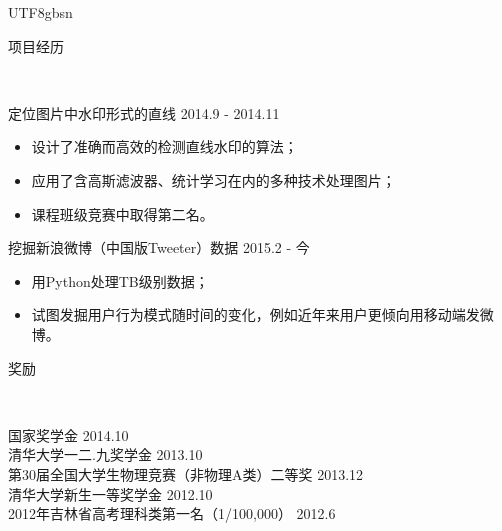 \documentclass[9pt]{article}
\newenvironment{changemargin}[2]{%
  \begin{list}{}{%
    \setlength{\topsep}{0pt}%
    \setlength{\leftmargin}{#1}%
    \setlength{\rightmargin}{#2}%
    \setlength{\listparindent}{\parindent}%
    \setlength{\itemindent}{\parindent}%
    \setlength{\parsep}{\parskip}%
  }%
  \item[]}{\end{list}
}
\newcommand{\lineover}{
	\begin{changemargin}{-0.05in}{-0.05in}
		\vspace*{-8pt}
		\hrulefill \\
		\vspace*{-2pt}
	\end{changemargin}
}
\newcommand{\header}[1]{
	\begin{changemargin}{-0.5in}{-0.5in}
		\scshape{#1}\\
  	\lineover
	\end{changemargin}
}
\newenvironment{body} {
	\vspace*{-16pt}
	\begin{changemargin}{-0.25in}{-0.5in}
  }	
	{\end{changemargin}
}
\begin{document}
\begin{CJK*}{UTF8}{gbsn}
\header{项目经历}

\begin{body}
	\vspace{14pt}
	定位图片中水印形式的直线 \hfill 2014.9 - 2014.11
	\begin{itemize}
	\itemsep 0pt
	\item 设计了准确而高效的检测直线水印的算法；
	\item 应用了含高斯滤波器、统计学习在内的多种技术处理图片；
	\item 课程班级竞赛中取得第二名。
	\end{itemize}
	\smallskip
	挖掘新浪微博（中国版Tweeter）数据 \hfill 2015.2 - 今
	\begin{itemize}
	\itemsep 0pt
	\item 用Python处理TB级别数据；
	\item  试图发掘用户行为模式随时间的变化，例如近年来用户更倾向用移动端发微博。
	\end{itemize}
	\smallskip

\end{body}
\smallskip
\smallskip

\header{奖励}

\begin{body}
	\vspace{14pt}
	国家奖学金 \hfill{} 2014.10\\
	\smallskip
	清华大学一二.九奖学金 \hfill{} 2013.10\\
	\smallskip
	第30届全国大学生物理竞赛（非物理A类）二等奖 \hfill{} 2013.12\\
	
	\smallskip
	清华大学新生一等奖学金 \hfill{} 2012.10\\
	\smallskip
	2012年吉林省高考理科类第一名（1/100,000） \hfill{} 2012.6
\end{body}

\smallskip
\smallskip





\end{CJK*}
\end{document}
